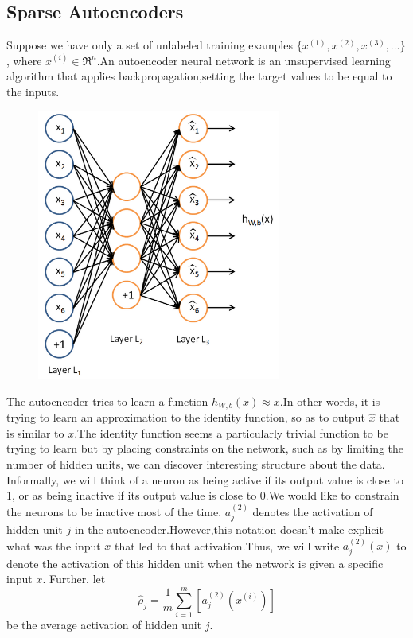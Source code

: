 \documentclass[11pt,twocolumn,letterpaper]{article}
\begin{document}
\subsection{Sparse Autoencoders}
Suppose we have only a set of unlabeled training examples $\textstyle \{x^{(1)}, x^{(2)}, x^{(3)}, \ldots\}$,
where $\textstyle x^{(i)} \in \Re^{n}$.An autoencoder neural network is an unsupervised learning algorithm that applies backpropagation,setting the target values to be equal to the inputs.
\begin{figure}[ht!]
\includegraphics[width=8cm]{2.png}
\end{figure}
The autoencoder tries to learn a function $\textstyle h_{W,b}(x) \approx x $.In other
words, it is trying to learn an approximation to the identity function, so as
to output $\textstyle \hat{x}$ that is similar to $\textstyle x$.The identity function seems a
particularly trivial function to be trying to learn but by placing constraints
on the network, such as by limiting the number of hidden units, we can discover
interesting structure about the data.
Informally, we will think of a neuron as being active if its output value is close to 1, or as being inactive if its output value is
close to 0.We would like to constrain the neurons to be inactive most of the
time. 
$\textstyle a^{(2)}_j$ denotes the activation of hidden unit $\textstyle j$ in the
autoencoder.However,this notation doesn't make explicit what was the input $ x $
that led to that activation.Thus, we will write $\textstyle a^{(2)}_j(x)$ to denote the activation
of this hidden unit when the network is given a specific input $\textstyle x$.  Further, let
$$\hat\rho_j = \frac{1}{m} \sum_{i=1}^m \left[ a^{(2)}_j(x^{(i)}) \right]
$$ be the average activation of hidden unit $\textstyle j$.
\end{document}
